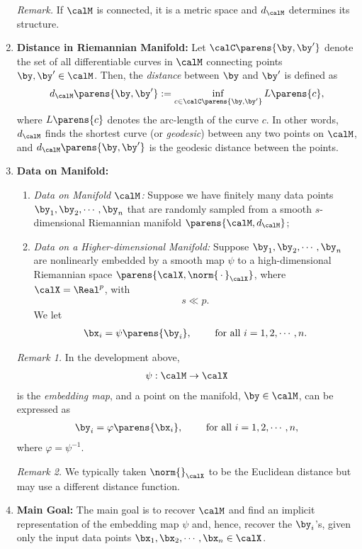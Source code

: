 \documentclass[12pt]{article}
\begin{document}
\begin{enumerate}[label=\textbf{\arabic*.}]
	\textit{Remark.} If $\calM$ is connected, it is a metric space and $d_{\calM}$ determines its structure. 
	
	\item \textbf{Distance in Riemannian Manifold:} Let $\calC \parens{\by, \by'}$ denote the set of all differentiable curves in $\calM$ connecting points $\by, \by' \in \calM$. Then, the \emph{distance} between $\by$ and $\by'$ is defined as 
	\begin{align}
		d_{\calM} \parens{\by, \by'} := \inf_{c \in \calC \parens{\by, \by'}} L \parens{c}, 
	\end{align}
	where $L \parens{c}$ denotes the arc-length of the curve $c$. In other words, $d_{\calM}$ finds the shortest curve (or \emph{geodesic}) between any two points on $\calM$, and $d_{\calM} \parens{\by, \by'}$ is the geodesic distance between the points. 
	
	\item \textbf{Data on Manifold:} 
	\begin{enumerate}
		\item \textit{Data on Manifold $\calM$:} Suppose we have finitely many data points $\by_1, \by_2, \cdots, \by_n$ that are randomly sampled from a smooth $s$-dimensional Riemannian manifold $\parens{\calM, d_{\calM}}$; 
		\item \textit{Data on a Higher-dimensional Manifold:} Suppose $\by_1, \by_2, \cdots, \by_n$ are nonlinearly embedded by a smooth map $\psi$ to a high-dimensional Riemannian space $\parens{\calX, \norm{\,\cdot\,}_{\calX}}$, where $\calX = \Real^p$, with 
		\begin{align*}
			s \ll p. 
		\end{align*}
		We let 
		\begin{align*}
			\bx_i = \psi \parens{\by_i}, \qquad \text{ for all } i = 1, 2, \cdots, n. 
		\end{align*}
	\end{enumerate}
	
	\textit{Remark 1.} In the development above, 
	\begin{align*}
		\psi: \calM \to \calX
	\end{align*}
	is the \emph{embedding map}, and a point on the manifold, $\by \in \calM$, can be expressed as 
	\begin{align*}
		\by_i = \varphi \parens{\bx_i}, \qquad \text{ for all } i = 1, 2, \cdots, n, 
	\end{align*}
	where $\varphi = \psi^{-1}$. 
	
	\textit{Remark 2.} We typically taken $\norm{}_{\calX}$ to be the Euclidean distance but may use a different distance function. 
	
	\item \textbf{Main Goal:} The main goal is to recover $\calM$ and find an implicit representation of the embedding map $\psi$ and, hence, recover the $\by_i$'s, given only the input data points $\bx_1, \bx_2, \cdots, \bx_n \in \calX$. 

\end{enumerate}
\end{document}
